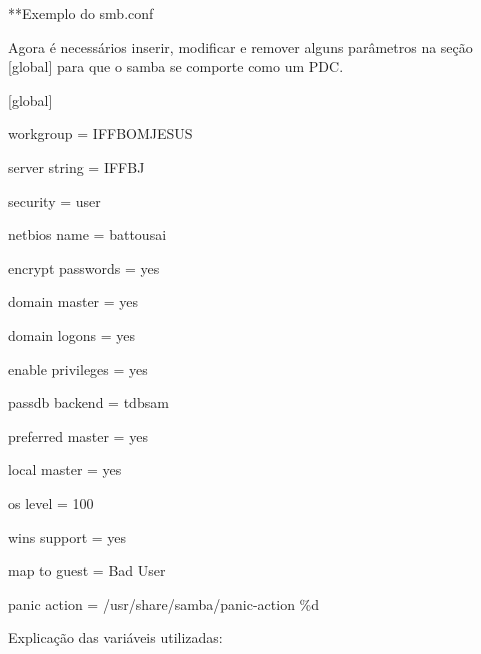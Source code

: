 **Exemplo do smb.conf

Agora é necessários inserir, modificar e remover alguns parâmetros na seção [global] para que o samba se comporte como um PDC.
{\raggedright

[global] 

	workgroup = IFFBOMJESUS 

	server string = IFFBJ        

	security = user

	netbios name = battousai

	encrypt passwords = yes

	domain master = yes

	domain logons = yes

	enable privileges = yes

	passdb backend = tdbsam

	preferred master = yes

	local master = yes

	os level = 100

	wins support = yes

	map to guest = Bad User

	panic action = /usr/share/samba/panic-action \%d
}

Explicação das variáveis utilizadas:

